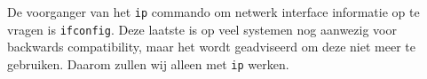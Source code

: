 De voorganger van het \texttt{ip} commando om netwerk interface informatie op te vragen is \texttt{ifconfig}. Deze laatste is op veel systemen nog aanwezig voor backwards compatibility, maar het wordt geadviseerd om deze niet meer te gebruiken. Daarom zullen wij alleen met \texttt{ip} werken.
